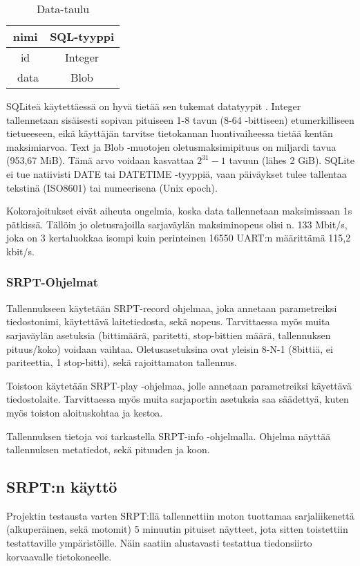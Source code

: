 \vspace{10mm}

\begin{table}[h]
\centering
\caption{Data-taulu}
\begin{tabular}{ c|c }
nimi & SQL-tyyppi \\\toprule
id & Integer \\\
data & Blob \\\bottomrule
\end{tabular}
\end{table}

SQLiteä käytettäessä on hyvä tietää sen tukemat datatyypit \cite{sqlite:datatype3}. Integer tallennetaan sisäisesti sopivan pituiseen 1-8 tavun (8-64 -bittiseen) etumerkilliseen tietueeseen, eikä käyttäjän tarvitse tietokannan luontivaiheessa tietää kentän maksimiarvoa. Text ja Blob -muotojen oletusmaksimipituus on miljardi tavua (953,67 MiB). Tämä arvo voidaan kasvattaa $2^{31}-1$ tavuun (lähes 2 GiB). SQLite ei tue natiivisti DATE tai DATETIME -tyyppiä, vaan päiväykset tulee tallentaa tekstinä (ISO8601) tai numeerisena (Unix epoch).

Kokorajoitukset eivät aiheuta ongelmia, koska data tallennetaan maksimissaan 1s pätkissä. Tällöin jo oletusrajoilla sarjaväylän maksiminopeus olisi n. 133 Mbit/s, joka on 3 kertaluokkaa isompi kuin perinteinen 16550 UART:n määrittämä 115,2 kbit/s.\cite{sqlite:limits}

\subsubsection{SRPT-Ohjelmat}
Tallennukseen käytetään SRPT-record ohjelmaa, joka annetaan parametreiksi tiedostonimi, käytettävä laitetiedosta, sekä nopeus. Tarvittaessa myös muita sarjaväylän asetuksia (bittimäärä, paritetti, stop-bittien määrä, tallennuksen pituus/koko) voidaan vaihtaa. Oletusasetuksina ovat yleisin 8-N-1 (8bittiä, ei pariteettia, 1 stop-bitti), sekä rajoittamaton tallennus.

Toistoon käytetään SRPT-play -ohjelmaa, jolle annetaan parametreiksi käyettävä tiedostolaite. Tarvittaessa myös muita sarjaportin asetuksia saa säädettyä, kuten myös toiston aloituskohtaa ja kestoa.

Tallennuksen tietoja voi tarkastella SRPT-info -ohjelmalla. Ohjelma näyttää tallennuksen metatiedot, sekä pituuden ja koon.

\subsection{SRPT:n käyttö}
Projektin testausta varten SRPT:llä tallennettiin moton tuottamaa sarjaliikenettä (alkuperäinen, sekä motomit) 5 minuutin pituiset näytteet, jota sitten toistettiin testattaville ympäristöille. Näin saatiin alustavasti testattua tiedonsiirto korvaavalle tietokoneelle.

